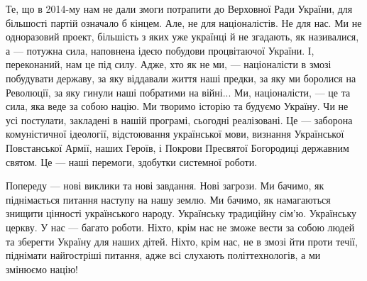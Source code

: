 Те, що в 2014-му нам не дали змоги потрапити до Верховної Ради України, для
більшості партій означало б кінцем. Але, не для націоналістів. Не для нас. Ми
не одноразовий проект, більшість з яких уже українці й не згадають, як
називалися, а — потужна сила, наповнена ідеєю побудови процвітаючої України. І,
переконаний, нам це під силу. Адже, хто як не ми, — націоналісти в змозі
побудувати державу, за яку віддавали життя наші предки, за яку ми боролися на
Революції, за яку гинули наші побратими на війні... Ми, націоналісти, — це та
сила, яка веде за собою націю. Ми творимо історію та будуємо Україну. Чи не усі
постулати, закладені в нашій програмі, сьогодні реалізовані. Це — заборона
комуністичної ідеології, відстоювання української мови, визнання Української
Повстанської Армії, наших Героїв, і Покрови Пресвятої Богородиці державним
святом. Це — наші перемоги, здобутки системної роботи. 

Попереду — нові виклики та нові завдання. Нові загрози. Ми бачимо, як
піднімається питання наступу на нашу землю. Ми бачимо, як намагаються знищити
цінності українського народу. Українську традиційну сім'ю. Українську церкву. У
нас — багато роботи. Ніхто, крім нас не зможе вести за собою людей та зберегти
Україну для наших дітей. Ніхто, крім нас, не в змозі йти проти течії, піднімати
найгостріші питання, адже всі слухають політтехнологів, а ми змінюємо націю!

